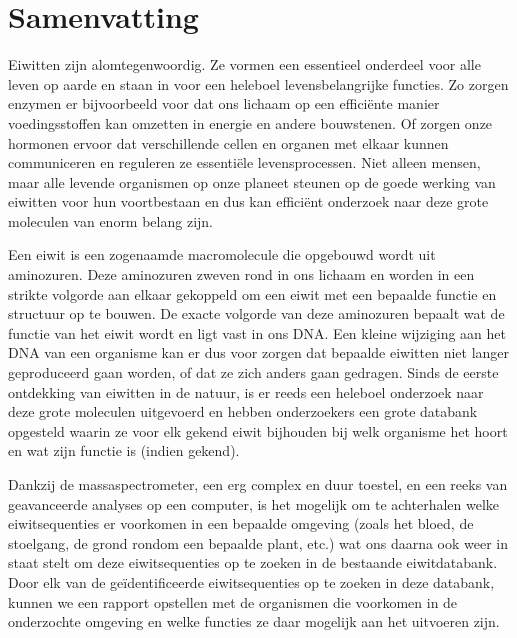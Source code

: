 \chapter*{Samenvatting}

Eiwitten zijn alomtegenwoordig.
Ze vormen een essentieel onderdeel voor alle leven op aarde en staan in voor een heleboel levensbelangrijke functies.
Zo zorgen enzymen er bijvoorbeeld voor dat ons lichaam op een efficiënte manier voedingsstoffen kan omzetten in energie en andere bouwstenen.
Of zorgen onze hormonen ervoor dat verschillende cellen en organen met elkaar kunnen communiceren en reguleren ze essentiële levensprocessen.
Niet alleen mensen, maar alle levende organismen op onze planeet steunen op de goede werking van eiwitten voor hun voortbestaan en dus kan efficiënt onderzoek naar deze grote moleculen van enorm belang zijn.

Een eiwit is een zogenaamde macromolecule die opgebouwd wordt uit aminozuren.
Deze aminozuren zweven rond in ons lichaam en worden in een strikte volgorde aan elkaar gekoppeld om een eiwit met een bepaalde functie en structuur op te bouwen.
De exacte volgorde van deze aminozuren bepaalt wat de functie van het eiwit wordt en ligt vast in ons DNA.
Een kleine wijziging aan het DNA van een organisme kan er dus voor zorgen dat bepaalde eiwitten niet langer geproduceerd gaan worden, of dat ze zich anders gaan gedragen.
Sinds de eerste ontdekking van eiwitten in de natuur, is er reeds een heleboel onderzoek naar deze grote moleculen uitgevoerd en hebben onderzoekers een grote databank opgesteld waarin ze voor elk gekend eiwit bijhouden bij welk organisme het hoort en wat zijn functie is (indien gekend).

Dankzij de massaspectrometer, een erg complex en duur toestel, en een reeks van geavanceerde analyses op een computer, is het mogelijk om te achterhalen welke eiwitsequenties er voorkomen in een bepaalde omgeving (zoals het bloed, de stoelgang, de grond rondom een bepaalde plant, etc.) wat ons daarna ook weer in staat stelt om deze eiwitsequenties op te zoeken in de bestaande eiwitdatabank.
Door elk van de geïdentificeerde eiwitsequenties op te zoeken in deze databank, kunnen we een rapport opstellen met de organismen die voorkomen in de onderzochte omgeving en welke functies ze daar mogelijk aan het uitvoeren zijn.

